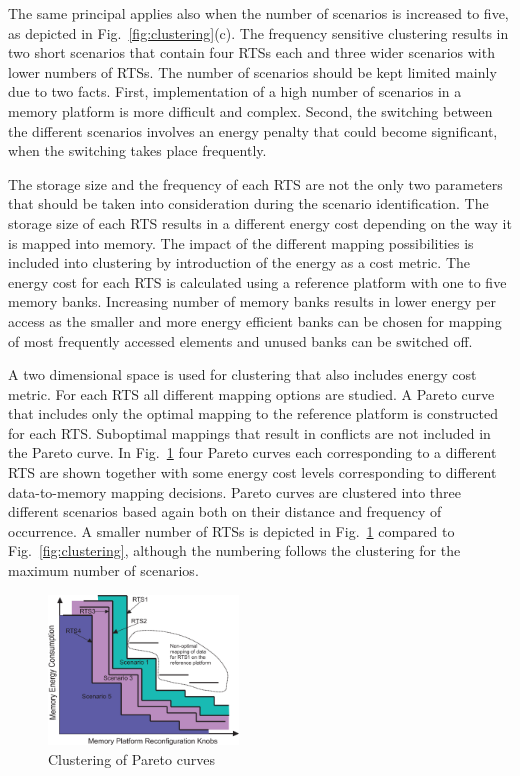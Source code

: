 \documentclass[a4paper,conference]{IEEEtran}
\begin{document}
The same principal applies also when the number of scenarios is increased to five, as depicted in Fig.~\ref{fig:clustering}(c). The frequency sensitive clustering results in two short scenarios that contain four RTSs each and three wider scenarios with lower numbers of RTSs. The number of scenarios should be kept limited mainly due to two facts. First, implementation of a high number of scenarios in a memory platform is more difficult and complex. Second, the switching between the different scenarios involves an energy penalty that could become significant, when the switching takes place frequently.

The storage size and the frequency of each RTS are not the only two parameters that should be taken into consideration during the scenario identification. The storage size of each RTS results in a different energy cost depending on the way it is mapped into memory. The impact of the different mapping possibilities is included into clustering by introduction of the energy as a cost metric. The energy cost for each RTS is calculated using a reference platform with one to five memory banks. Increasing number of memory banks results in lower energy per access as the smaller and more energy efficient banks can be chosen for mapping of most frequently accessed elements and unused banks can be switched off.

A two dimensional space is used for clustering that also includes energy cost metric. For each RTS all different mapping options are studied. A Pareto curve that includes only the optimal mapping to the reference platform is constructed for each RTS. Suboptimal mappings that result in conflicts are not included in the Pareto curve. In Fig.~\ref{fig:pareto} four Pareto curves each corresponding to a different RTS are shown together with some energy cost levels corresponding to different data-to-memory mapping decisions. Pareto curves are clustered into three different scenarios based again both on their distance and frequency of occurrence. A smaller number of RTSs is depicted in Fig.~\ref{fig:pareto} compared to Fig.~\ref{fig:clustering}, although the numbering follows the clustering for the maximum number of scenarios. 

\begin{figure}[!t]
\centering
\includegraphics[width=0.45\textwidth]{Images/2DClustering.eps}
\caption{Clustering of Pareto curves}
\label{fig:pareto}
\end{figure}
\end{document}
